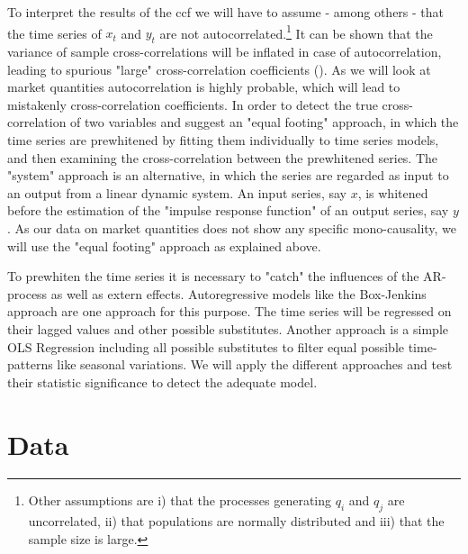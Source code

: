 \documentclass[10pt,a4paper]{scrreprt}
\begin{document}
To interpret the results of the ccf we will have to assume - among others - that the time series of $x_t$ and $y_t$ are not autocorrelated.\footnote{Other assumptions are i) that the processes generating $q_i$ and $q_j$ are uncorrelated, ii) that populations are normally distributed and iii) that the sample size is large.} It can be shown that the variance of sample cross-correlations will be inflated in case of autocorrelation, leading to spurious "large" cross-correlation coefficients (\cite[158]{chatfield_analysis_2004}). As we will look at market quantities autocorrelation is highly probable, which will lead to mistakenly cross-correlation coefficients. In order to detect the true cross-correlation of two variables \cite{jenkins_spectral_1968} and \cite{brockwell_introduction_2002} suggest an "equal footing" approach, in which the time series are prewhitened by fitting them individually to time series models, and then examining the cross-correlation between the prewhitened series. The "system" approach is an alternative, in which the series are regarded as input to an output from a linear dynamic system. An input series, say $x$, is whitened before the estimation of the "impulse response function" of an output series, say $y$. As our data on market quantities does not show any specific mono-causality, we will use the "equal footing" approach as explained above. 

To prewhiten the time series it is necessary to "catch" the influences of the AR-process as well as extern effects. Autoregressive models like the Box-Jenkins approach are one approach for this purpose. The time series will be regressed on their lagged values and other possible substitutes. Another approach is a simple OLS Regression including all possible substitutes to filter equal possible time-patterns like seasonal variations. We will apply the different approaches and test their statistic significance to detect the adequate model.

\section{Data}\label{sec:data}
\end{document}
